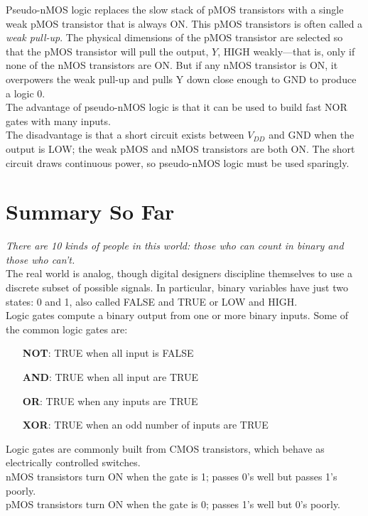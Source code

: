 \documentclass[12pt]{article}
\theoremstyle{definition}
\begin{document}
  Pseudo-nMOS logic replaces the slow stack of pMOS transistors with a single weak pMOS transistor that is always ON.
  This pMOS transistors is often called a \emph{weak pull-up}.
  The physical dimensions of the pMOS transistor are selected so that the pMOS transistor will pull the output, $Y$, HIGH weakly---that is, only if none of the nMOS transistors are ON.
  But if any nMOS transistor is ON, it overpowers the weak pull-up and pulls Y down close enough to GND to produce a logic 0. \\

  The advantage of pseudo-nMOS logic is that it can be used to build fast NOR gates with many inputs. \\
  The disadvantage is that a short circuit exists between $V_{DD}$ and GND when the output is LOW; the weak pMOS and nMOS transistors are both ON.
  The short circuit draws continuous power, so pseudo-nMOS logic must be used sparingly.

  \newpage
  \section{Summary So Far}
  \emph{There are 10 kinds of people in this world: those who can count in
binary and those who can't.} \\
  The real world is analog, though digital designers discipline themselves to use a discrete subset of possible signals.
  In particular, binary variables have just two states: 0 and 1, also called FALSE and TRUE or LOW and HIGH. \\

  Logic gates compute a binary output from one or more binary inputs.
  Some of the common logic gates are:
  \begin{itemize}
    \item[\textbf{NOT}:] TRUE when all input is FALSE
    \item[\textbf{AND}:] TRUE when all input are TRUE
    \item[\textbf{OR}:]  TRUE when any inputs are TRUE
    \item[\textbf{XOR}:] TRUE when an odd number of inputs are TRUE
  \end{itemize}

  Logic gates are commonly built from CMOS transistors, which behave as electrically controlled switches. \\
  nMOS transistors turn ON when the gate is 1;
  passes 0's well but passes 1's poorly. \\
  pMOS transistors turn ON when the gate is 0;
  passes 1's well but 0's poorly. \\
\end{document}
